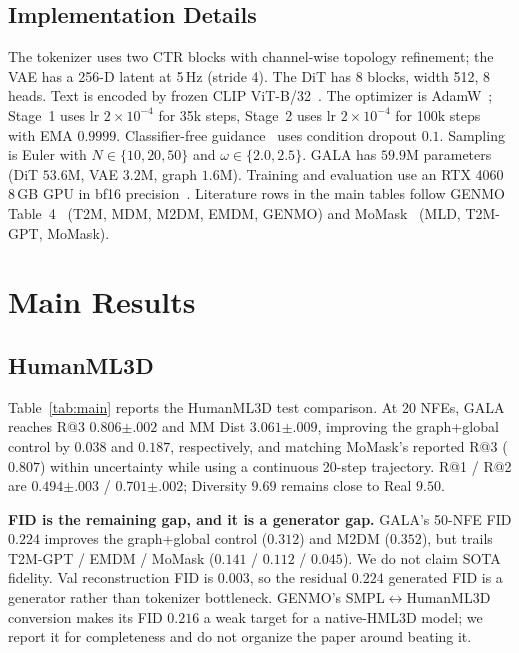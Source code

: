 \documentclass[journal]{IEEEtran}
\begin{document}
\subsection{Implementation Details}
\label{sec:setup-impl}

The tokenizer uses two CTR blocks with channel-wise topology refinement; the VAE has a 256-D latent at 5\,Hz (stride 4). The DiT has 8 blocks, width 512, 8 heads. Text is encoded by frozen CLIP ViT-B/32~\cite{radford2021clip}. The optimizer is AdamW~\cite{loshchilov2019adamw}; Stage~1 uses lr $2{\times}10^{-4}$ for 35k steps, Stage~2 uses lr $2{\times}10^{-4}$ for 100k steps with EMA $0.9999$. Classifier-free guidance~\cite{ho2022cfg} uses condition dropout $0.1$. Sampling is Euler with $N\in\{10,20,50\}$ and $\omega\in\{2.0,2.5\}$. GALA has $59.9$M parameters (DiT $53.6$M, VAE $3.2$M, graph $1.6$M). Training and evaluation use an RTX 4060 8\,GB GPU in bf16 precision~\cite{micikevicius2018mixed}. Literature rows in the main tables follow GENMO Table~4~\cite{li2025genmo} (T2M, MDM, M2DM, EMDM, GENMO) and MoMask~\cite{guo2024momask} (MLD, T2M-GPT, MoMask).

\section{Main Results}

\subsection{HumanML3D}
\label{sec:main-hml}

Table~\ref{tab:main} reports the HumanML3D test comparison. At 20 NFEs, GALA reaches R@3 $0.806{\pm.002}$ and MM Dist $3.061{\pm.009}$, improving the graph+global control by $0.038$ and $0.187$, respectively, and matching MoMask's reported R@3 ($0.807$) within uncertainty while using a continuous 20-step trajectory. R@1 / R@2 are $0.494{\pm.003}$ / $0.701{\pm.002}$; Diversity $9.69$ remains close to Real $9.50$.

\textbf{FID is the remaining gap, and it is a generator gap.} GALA's 50-NFE FID $0.224$ improves the graph+global control ($0.312$) and M2DM ($0.352$), but trails T2M-GPT / EMDM / MoMask ($0.141$ / $0.112$ / $0.045$). We do not claim SOTA fidelity. Val reconstruction FID is $0.003$, so the residual $0.224$ generated FID is a generator rather than tokenizer bottleneck. GENMO's SMPL$\leftrightarrow$HumanML3D conversion makes its FID $0.216$ a weak target for a native-HML3D model; we report it for completeness and do not organize the paper around beating it.
\end{document}
